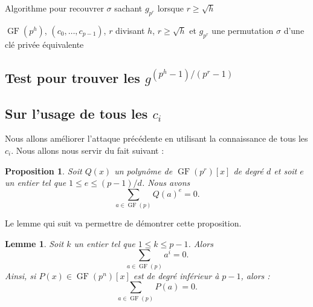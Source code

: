 \documentclass[a4paper, titlepage]{article}
\newtheorem{lemm}[theo]{Lemme}
\newtheorem{prop}[theo]{Proposition}
\theoremstyle{definition}
\theoremstyle{remark}
\def\gf{\operatorname{GF}}
\begin{document}
\begin{algorithm}[H]
\caption{Algorithme pour recouvrer $\sigma$ sachant $g_{p^r}$ lorsque $r\geqslant \sqrt h$}
\label{algogpr}
\begin{algorithmic}[1]
\REQUIRE $\gf(p^h)$, $(c_0,\dots, c_{p-1})$, $r$ divisant $h$, $r\geqslant \sqrt h$ et $g_{p^r}$
\ENSURE une permutation $\sigma$ d'une clé privée équivalente
\FORALL{$u$ dans $\gf(p)$} 
		
	\ENDFOR
		\RETURN{$\sigma$}
	\ENDIF
\ENDFOR
\end{algorithmic}
\end{algorithm}

\subsection{Test pour trouver les $g^{(p^h-1)/(p^r-1)}$}

\subsection{Sur l'usage de tous les $c_i$}

Nous allons améliorer l'attaque précédente en utilisant la connaissance de tous les $c_i$. Nous allons nous servir du fait suivant :

\begin{prop}
Soit $Q(x)$ un polynôme de $\gf(p^r)[x]$ de degré $d$ et soit $e$ un entier tel que $1 \leqslant e \leqslant (p-1)/d$. Nous avons $$\sum_{a \in \gf(p)} Q(a)^e = 0.$$
\end{prop}

Le lemme qui suit va permettre de démontrer cette proposition.

\begin{lemm}
Soit $k$ un entier tel que $1 \leqslant k \leqslant p-1$. Alors
$$\sum_{a\in\gf(p)} a^i = 0.$$
Ainsi, si $P(x) \in \gf(p^n)[x]$ est de degré inférieur à $p-1$, alors : $$\sum_{a\in\gf(p)} P(a) = 0.$$
\end{lemm}
\end{document}
